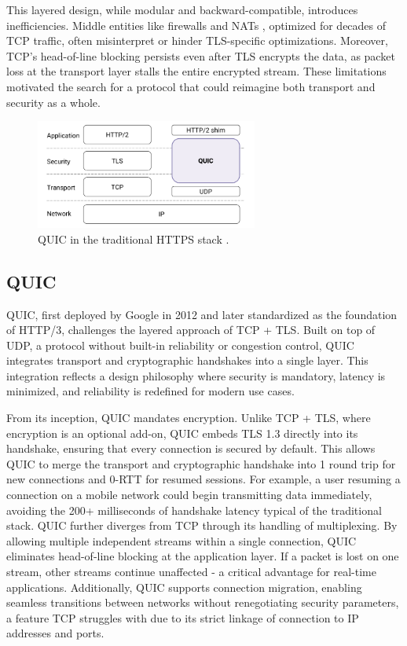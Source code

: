 This layered design, while modular and backward-compatible, introduces inefficiencies. Middle entities like firewalls and NATs \cite{langley2017quic}, optimized for decades of TCP traffic, often misinterpret or hinder TLS-specific optimizations. Moreover, TCP's head-of-line blocking persists even after TLS encrypts the data, as packet loss at the transport layer stalls the entire encrypted stream. These limitations motivated the search for a protocol that could reimagine both transport and security as a whole.

\begin{figure}[!b]
	\centering
	\includegraphics[width=0.65\textwidth]{images/quic-stack.png}
	\caption{QUIC in the traditional HTTPS stack \cite{langley2017quic}.}
\end{figure}

\subsection{QUIC}
QUIC, first deployed by Google in 2012 and later standardized as the foundation of HTTP/3, challenges the layered approach of TCP + TLS. Built on top of UDP, a protocol without built-in reliability or congestion control, QUIC integrates transport and cryptographic handshakes into a single layer. This integration reflects a design philosophy where security is mandatory, latency is minimized, and reliability is redefined for modern use cases.

From its inception, QUIC mandates encryption. Unlike TCP + TLS, where encryption is an optional add-on, QUIC embeds TLS 1.3 directly into its handshake, ensuring that every connection is secured by default. This allows QUIC to merge the transport and cryptographic handshake into 1 round trip for new connections and 0-RTT for resumed sessions. For example, a user resuming a connection on a mobile network could begin transmitting data immediately, avoiding the 200+ milliseconds of handshake latency typical of the traditional stack. QUIC further diverges from TCP through its handling of multiplexing. By allowing multiple independent streams within a single connection, QUIC eliminates head-of-line blocking at the application layer. If a packet is lost on one stream, other streams continue unaffected - a critical advantage for real-time applications. Additionally, QUIC supports connection migration, enabling seamless transitions between networks without renegotiating security parameters, a feature TCP struggles with due to its strict linkage of connection to IP addresses and ports.